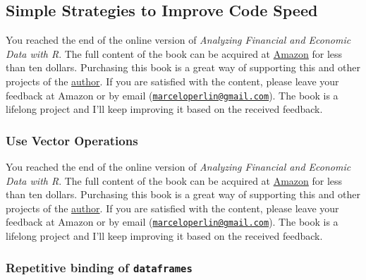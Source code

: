\documentclass[
  12pt,
]{book}
\newenvironment{pleasebuyit}
{\begin{noteblock}
		
	} {\end{noteblock}}
\begin{document}
\hypertarget{simple-strategies-to-improve-code-speed}{%
\subsection{Simple Strategies to Improve Code Speed}\label{simple-strategies-to-improve-code-speed}}

\begin{pleasebuyit}
You reached the end of the online version of \emph{Analyzing Financial
and Economic Data with R}. The full content of the book can be acquired
at \href{https://www.amazon.com/dp/B084LSNXMN}{Amazon} for less than ten
dollars. Purchasing this book is a great way of supporting this and
other projects of the \href{https://www.msperlin.com/blog/}{author}. If
you are satisfied with the content, please leave your feedback at Amazon
or by email
(\href{mailto:marceloperlin@gmail.com}{\nolinkurl{marceloperlin@gmail.com}}).
The book is a lifelong project and I'll keep improving it based on the
received feedback.
\end{pleasebuyit}

\hypertarget{use-vector-operations}{%
\subsubsection{Use Vector Operations}\label{use-vector-operations}}

\begin{pleasebuyit}
You reached the end of the online version of \emph{Analyzing Financial
and Economic Data with R}. The full content of the book can be acquired
at \href{https://www.amazon.com/dp/B084LSNXMN}{Amazon} for less than ten
dollars. Purchasing this book is a great way of supporting this and
other projects of the \href{https://www.msperlin.com/blog/}{author}. If
you are satisfied with the content, please leave your feedback at Amazon
or by email
(\href{mailto:marceloperlin@gmail.com}{\nolinkurl{marceloperlin@gmail.com}}).
The book is a lifelong project and I'll keep improving it based on the
received feedback.
\end{pleasebuyit}

\hypertarget{repetitive-binding-of-dataframes}{%
\subsubsection{\texorpdfstring{Repetitive binding of \texttt{dataframes}}{Repetitive binding of dataframes}}\label{repetitive-binding-of-dataframes}}
\end{document}

